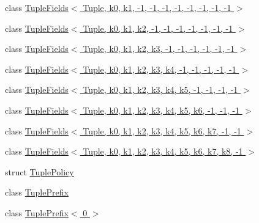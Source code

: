 \begin{DoxyCompactItemize}
\item 
class \hyperlink{classtesting_1_1internal_1_1_tuple_fields_3_01_tuple_00_01k0_00_01k1_00_01-1_00_01-1_00_01-1_00_bfbbbfc9cc03949b0b1ff3620709d8ff}{Tuple\+Fields$<$ Tuple, k0, k1, -\/1, -\/1, -\/1, -\/1, -\/1, -\/1, -\/1, -\/1 $>$}
\item 
class \hyperlink{classtesting_1_1internal_1_1_tuple_fields_3_01_tuple_00_01k0_00_01k1_00_01k2_00_01-1_00_01-1_00_897bcaf4b51057696318fe39b8a2dc88}{Tuple\+Fields$<$ Tuple, k0, k1, k2, -\/1, -\/1, -\/1, -\/1, -\/1, -\/1, -\/1 $>$}
\item 
class \hyperlink{classtesting_1_1internal_1_1_tuple_fields_3_01_tuple_00_01k0_00_01k1_00_01k2_00_01k3_00_01-1_00_d404aa1c50b4758daf5bb2f78d0fb44c}{Tuple\+Fields$<$ Tuple, k0, k1, k2, k3, -\/1, -\/1, -\/1, -\/1, -\/1, -\/1 $>$}
\item 
class \hyperlink{classtesting_1_1internal_1_1_tuple_fields_3_01_tuple_00_01k0_00_01k1_00_01k2_00_01k3_00_01k4_00_24d73e0cd5fb480b4f69b3d189a737e1}{Tuple\+Fields$<$ Tuple, k0, k1, k2, k3, k4, -\/1, -\/1, -\/1, -\/1, -\/1 $>$}
\item 
class \hyperlink{classtesting_1_1internal_1_1_tuple_fields_3_01_tuple_00_01k0_00_01k1_00_01k2_00_01k3_00_01k4_00_fc3c297a037e5312ea5ea32562e3997e}{Tuple\+Fields$<$ Tuple, k0, k1, k2, k3, k4, k5, -\/1, -\/1, -\/1, -\/1 $>$}
\item 
class \hyperlink{classtesting_1_1internal_1_1_tuple_fields_3_01_tuple_00_01k0_00_01k1_00_01k2_00_01k3_00_01k4_00_15a5f7560bc4eac1ca3e5cac752bf68d}{Tuple\+Fields$<$ Tuple, k0, k1, k2, k3, k4, k5, k6, -\/1, -\/1, -\/1 $>$}
\item 
class \hyperlink{classtesting_1_1internal_1_1_tuple_fields_3_01_tuple_00_01k0_00_01k1_00_01k2_00_01k3_00_01k4_00_cda35487ca7d3bd5a9557919642ae14b}{Tuple\+Fields$<$ Tuple, k0, k1, k2, k3, k4, k5, k6, k7, -\/1, -\/1 $>$}
\item 
class \hyperlink{classtesting_1_1internal_1_1_tuple_fields_3_01_tuple_00_01k0_00_01k1_00_01k2_00_01k3_00_01k4_00_9c7cea784cec512ef84e111fc1d12260}{Tuple\+Fields$<$ Tuple, k0, k1, k2, k3, k4, k5, k6, k7, k8, -\/1 $>$}
\item 
struct \hyperlink{structtesting_1_1internal_1_1_tuple_policy}{Tuple\+Policy}
\item 
class \hyperlink{classtesting_1_1internal_1_1_tuple_prefix}{Tuple\+Prefix}
\item 
class \hyperlink{classtesting_1_1internal_1_1_tuple_prefix_3_010_01_4}{Tuple\+Prefix$<$ 0 $>$}
\item 

\end{DoxyCompactItemize}
